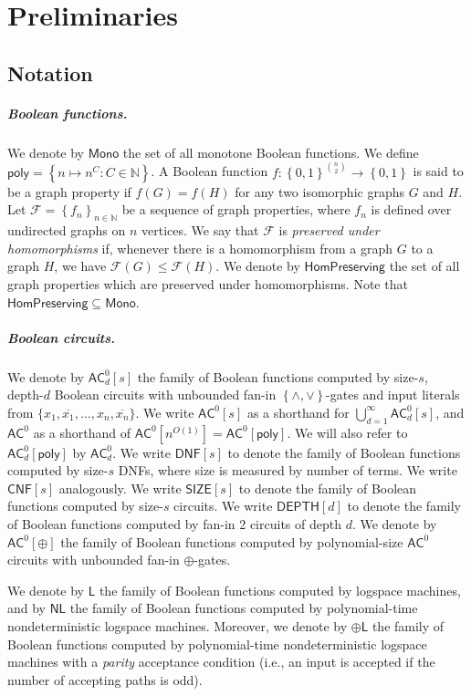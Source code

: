 \documentclass[10pt,a4paper]{article}
\newcommand{\poly}{\mathsf{poly}}
\newcommand{\complexityfont}[1]{\mathsf{#1}}
\newcommand\NL           {\complexityfont{NL}}
\def\AC           {\complexityfont{AC}}
\def\pL           {\oplus\complexityfont{L}}
\def\SIZE         {\complexityfont{SIZE}}
\def\DEPTH        {\complexityfont{DEPTH}}
\renewcommand{\L} {\complexityfont{L}}
\newcommand{\monfns}{\mathsf{Mono}}
\newcommand{\HomPres}{\mathsf{HomPreserving}}
\newcommand{\DNF}{\mathsf{DNF}}
\newcommand{\CNF}{\mathsf{CNF}}
\def\sseq{\subseteq}
\newcommand{\set}[1]{\left\{#1\right\}}
\newcommand{\blt}{\set{0,1}}
\newcommand{\xor}{\oplus}
\def\bbn{{\mathbb N}}
\def\calf{{\mathcal F}}
\begin{document}
\section{Preliminaries}

\subsection{Notation}

\subparagraph{Boolean functions.}

We denote by $\monfns$ the set of all monotone Boolean functions.
We define $\poly = \set{n \mapsto n^C : C \in \bbn}$.
A Boolean function
    $f : \blt^{\binom{n}{2}} \to \blt$ is said to be a graph property
    if $f(G) = f(H)$ for any two isomorphic graphs $G$ and $H$.
Let $\calf = \set{f_n}_{n \in \bbn}$
    be a sequence of graph properties, where $f_n$ is defined over undirected graphs on
    $n$ vertices.
    We say that $\calf$ is
    \emph{preserved under homomorphisms} if,
    whenever there is a homomorphism from a graph $G$ to a graph $H$,
    we have $\calf(G) \leq \calf(H)$.
    We denote by $\HomPres$ 
    the set of all 
    graph properties which are preserved under homomorphisms.
    Note that $\HomPres \sseq \monfns$.

    \subparagraph{Boolean circuits.}

    We denote by $\AC^0_d[s]$ 
    the family of Boolean functions computed by
    size-$s$,
    depth-$d$
    Boolean circuits with unbounded fan-in $\set{\land,\lor}$-gates and input literals from $\{x_1, \overline{x_1}, \ldots, x_n, \overline{x_n}\}$.
    We write $\AC^0[s]$ as a shorthand for
    $\bigcup_{d = 1}^\infty \AC^0_d[s]$,
    and $\AC^0$ as a shorthand of $\AC^0[n^{O(1)}] = \AC^0[\poly]$.
    We will also refer to $\AC^0_d[\poly]$
    by $\AC^0_d$.
We write $\DNF[s]$ to denote the family of Boolean functions
    computed by size-$s$ DNFs, where size is measured by  number of terms.
    We write $\CNF[s]$ analogously.
    We write $\SIZE[s]$ to denote
    the family of Boolean functions
    computed by size-$s$ circuits.
    We write $\DEPTH[d]$ to denote
    the family of Boolean functions
    computed by fan-in 2 circuits of depth $d$.
We denote by $\AC^0[\xor]$ the family of Boolean functions computed by
polynomial-size $\AC^0$ circuits with unbounded fan-in $\xor$-gates.

We denote by $\L$ the 
family of
Boolean functions
computed by  logspace machines,
and by $\NL$ the family of Boolean functions
computed by polynomial-time nondeterministic logspace machines.
Moreover, we denote by $\pL$
the family of Boolean functions computed by
polynomial-time nondeterministic logspace machines with a \emph{parity}
acceptance condition (i.e.,
an input is accepted if the number of accepting paths is odd).
\end{document}
